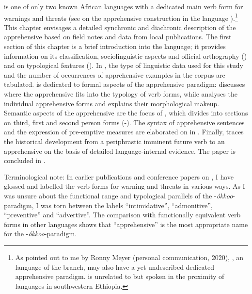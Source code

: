 \documentclass[output=paper,colorlinks,citecolor=brown,]{langscibook}
\begin{document}
 is one of only two known African languages with a dedicated main verb form for warnings and threats (see \citealt{chapters/fedotov} on the apprehensive construction in the  language ).\footnote{As pointed out to me by Ronny Meyer (personal communication, 2020), , an  language of the  branch, may also have a yet undescribed dedicated apprehensive paradigm.  is unrelated to  but spoken in the proximity of  languages in southwestern Ethiopia.} This chapter envisages a detailed synchronic and diachronic description of the  apprehensive based on field notes and data from local publications. The first section of this chapter is a brief introduction into the language; it provides information on its classification, sociolinguistic aspects and official orthography () and on typological features (). In , the type of linguistic data used for this study and the number of occurrences of apprehensive examples in the corpus are tabulated.  is dedicated to formal aspects of the apprehensive paradigm:  discusses where the apprehensive fits into the typology of  verb forms, while  analyses the individual apprehensive forms and explains their morphological makeup. Semantic aspects of the apprehensive are the focus of , which divides into sections on third, first and second person forms (-). The syntax of apprehensive sentences and the expression of pre-emptive measures are elaborated on in . Finally,  traces the historical development from a periphrastic imminent future verb to an apprehensive on the basis of detailed language-internal evidence. The paper is concluded in .

Terminological note: In earlier publications and conference papers on , I have glossed and labelled the verb forms for warning and threats in various ways. As I was unsure about the functional range and typological parallels of the \nobreakdash-\textit{ókkoo}-paradigm, I was torn between the labels ``intimidative'', ``admonitive'', ``preventive'' and ``advertive''. The comparison with functionally equivalent verb forms in other languages shows that ``apprehensive'' is the most appropriate name for the \nobreakdash-\textit{ókkoo}-paradigm.
\end{document}

